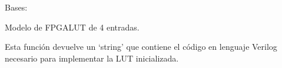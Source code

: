 \documentclass[letterpaper,10pt,english]{sphinxmanual}
\begin{document}
\begin{fulllineitems}
\label{\detokenize{myfpga:myfpga.Lut4}}
\pysigstartsignatures
{}
\pysigstopsignatures
\sphinxAtStartPar
Bases: 

\sphinxAtStartPar
Modelo de FPGA\sphinxhyphen{}LUT de 4 entradas.

\begin{fulllineitems}
\label{\detokenize{myfpga:myfpga.Lut4.impl}}
\pysigstartsignatures
{}
\pysigstopsignatures
\sphinxAtStartPar
Esta función devuelve un ‘string’ que contiene el código en lenguaje 
Verilog necesario para implementar la LUT inicializada.

\end{fulllineitems}


\end{fulllineitems}

\end{document}
